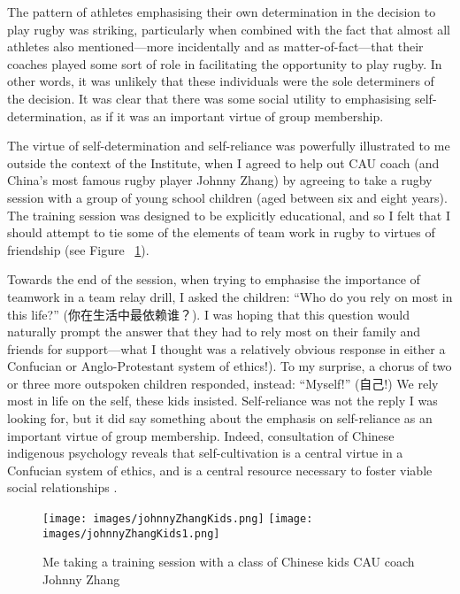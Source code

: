 \begin{CJK}{UTF8}{gbsn}
The pattern of athletes emphasising their own determination in the decision to play rugby was striking, particularly when combined with the fact that almost all athletes also mentioned---more incidentally and as matter-of-fact---that their coaches played some sort of role in facilitating the opportunity to play rugby.  In other words, it was unlikely that these individuals were the sole determiners of the decision.  It was clear that there was some social utility to emphasising self-determination, as if it was an important virtue of group membership.

The virtue of self-determination and self-reliance was powerfully illustrated to me outside the context of the Institute, when I agreed to help out CAU coach (and China's most famous rugby player Johnny Zhang) by agreeing to take a rugby session with a group of young school children (aged between six and eight years).  The training session was designed to be explicitly educational, and so I felt that I should attempt to tie some of the elements of team work in rugby to virtues of friendship (see Figure ~\ref{fig:johnnyZhangKids}).

Towards the end of the session, when trying to emphasise the importance of teamwork in a team relay drill, I asked the children: ``Who do you rely on most in this life?'' (你在生活中最依赖谁？).  I was hoping that this question would naturally prompt the answer that they had to rely most on their family and friends for support---what I thought was a relatively obvious response in either a Confucian or Anglo-Protestant system of ethics!).  To my surprise, a chorus of two or three more outspoken children responded, instead: ``Myself!'' (自己!) We rely most in life on the self, these kids insisted. Self-reliance was not the reply I was looking for, but it did say something about the emphasis on self-reliance as an important virtue of group membership.  Indeed, consultation of Chinese indigenous psychology reveals that self-cultivation is a central virtue in a Confucian system of ethics, and is a central resource necessary to foster viable social relationships \citep{Liu2014}.


\begin{figure}[htbp]
  \begin{center}
    \texttt{[image: images/johnnyZhangKids.png]}
    \texttt{[image: images/johnnyZhangKids1.png]}
      \caption{Me taking a training session with a class of Chinese kids CAU coach Johnny Zhang}
        \label{fig:johnnyZhangKids}
   \end{center}
\end{figure}



\end{CJK}
